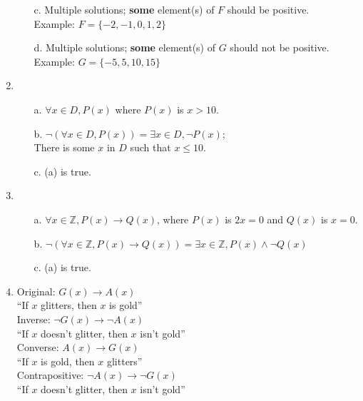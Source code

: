 \begin{enumerate}
\begin{itemize}
                \item[c.]   Multiple solutions; \textbf{some} element(s) of $F$ should be positive. \\
                            Example: $F = \{ -2, -1, 0, 1, 2 \}$
                            
                \item[d.]   Multiple solutions; \textbf{some} element(s) of $G$ should not be positive. \\
                            Example: $G = \{ -5, 5, 10, 15 \}$
            \end{itemize}

        \item   
            \begin{itemize}
                \item[a.]   $\forall x \in D, P(x)$ where $P(x)$ is $x > 10$.
                \item[b.]   $\neg(\forall x \in D, P(x)) = \exists x \in D, \neg P(x)$; \\
                            There is some $x$ in $D$ such that $x \leq 10$.
                \item[c.]   (a) is true.
            \end{itemize}

        \item
            \begin{itemize}
                \item[a.]   $\forall x \in \mathbb{Z}, P(x) \to Q(x)$, where $P(x)$ is $2x = 0$ and $Q(x)$ is $x = 0$.

                \item[b.]   $\neg(\forall x \in \mathbb{Z}, P(x) \to Q(x)) = \exists x \in \mathbb{Z}, P(x) \land \neg Q(x)$

                \item[c.]   (a) is true.
            \end{itemize}

        \item   Original:           $G(x) \to A(x)$             \\ \tab ``If $x$ glitters, then $x$ is gold''
                \\
                Inverse:            $\neg G(x) \to \neg A(x)$   \\ \tab ``If $x$ doesn't glitter, then $x$ isn't gold''
                \\
                Converse:           $A(x) \to G(x)$             \\ \tab ``If $x$ is gold, then $x$ glitters''
                \\
                Contrapositive:     $\neg A(x) \to \neg G(x)$   \\ \tab ``If $x$ doesn't glitter, then $x$ isn't gold''


\end{enumerate}
